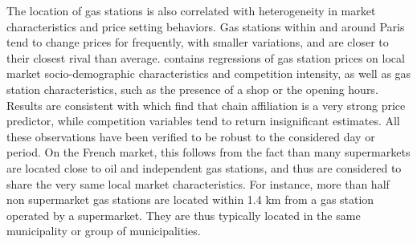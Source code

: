 \documentclass[english]{article}
\begin{document}
The location of gas stations is also correlated with heterogeneity in market characteristics and price setting behaviors. Gas stations within and around Paris tend to change prices for frequently, with smaller variations, and are closer to their closest rival than average. \cite{CHA16} contains regressions of gas station prices on local market socio-demographic characteristics and competition intensity, as well as gas station characteristics, such as the presence of a shop or the opening hours. Results are consistent with \cite{HOS08} which find that chain affiliation is a very strong price predictor, while competition variables tend to return insignificant estimates. All these observations have been verified to be robust to the considered day or period. On the French market, this follows from the fact than many supermarkets are located close to oil and independent gas stations, and thus are considered to share the very same local market characteristics. For instance, more than half non supermarket gas stations are located within 1.4 km from a gas station operated by a supermarket. They are thus typically located in the same municipality or group of municipalities.
\end{document}
